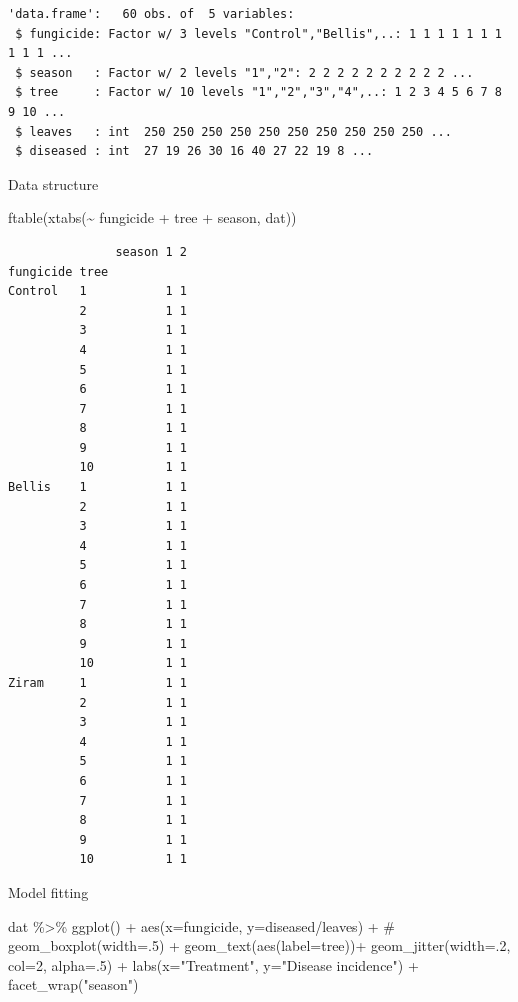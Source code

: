 \documentclass[
  letterpaper,
  DIV=11,
  numbers=noendperiod]{scrreport}
\newenvironment{Shaded}{\begin{snugshade}}{\end{snugshade}}
\newcommand{\AttributeTok}[1]{\textcolor[rgb]{0.40,0.45,0.13}{#1}}
\newcommand{\CommentTok}[1]{\textcolor[rgb]{0.37,0.37,0.37}{#1}}
\newcommand{\DecValTok}[1]{\textcolor[rgb]{0.68,0.00,0.00}{#1}}
\newcommand{\FunctionTok}[1]{\textcolor[rgb]{0.28,0.35,0.67}{#1}}
\newcommand{\NormalTok}[1]{\textcolor[rgb]{0.00,0.23,0.31}{#1}}
\newcommand{\SpecialCharTok}[1]{\textcolor[rgb]{0.37,0.37,0.37}{#1}}
\newcommand{\StringTok}[1]{\textcolor[rgb]{0.13,0.47,0.30}{#1}}
\begin{document}
\begin{verbatim}
'data.frame':   60 obs. of  5 variables:
 $ fungicide: Factor w/ 3 levels "Control","Bellis",..: 1 1 1 1 1 1 1 1 1 1 ...
 $ season   : Factor w/ 2 levels "1","2": 2 2 2 2 2 2 2 2 2 2 ...
 $ tree     : Factor w/ 10 levels "1","2","3","4",..: 1 2 3 4 5 6 7 8 9 10 ...
 $ leaves   : int  250 250 250 250 250 250 250 250 250 250 ...
 $ diseased : int  27 19 26 30 16 40 27 22 19 8 ...
\end{verbatim}

Data structure

\begin{Shaded}
\begin{Highlighting}[]
\FunctionTok{ftable}\NormalTok{(}\FunctionTok{xtabs}\NormalTok{(}\SpecialCharTok{\textasciitilde{}}\NormalTok{ fungicide }\SpecialCharTok{+}\NormalTok{ tree }\SpecialCharTok{+}\NormalTok{ season, dat))}
\end{Highlighting}
\end{Shaded}

\begin{verbatim}
               season 1 2
fungicide tree           
Control   1           1 1
          2           1 1
          3           1 1
          4           1 1
          5           1 1
          6           1 1
          7           1 1
          8           1 1
          9           1 1
          10          1 1
Bellis    1           1 1
          2           1 1
          3           1 1
          4           1 1
          5           1 1
          6           1 1
          7           1 1
          8           1 1
          9           1 1
          10          1 1
Ziram     1           1 1
          2           1 1
          3           1 1
          4           1 1
          5           1 1
          6           1 1
          7           1 1
          8           1 1
          9           1 1
          10          1 1
\end{verbatim}

Model fitting

\begin{Shaded}
\begin{Highlighting}[]
\NormalTok{dat }\SpecialCharTok{\%\textgreater{}\%} 
  \FunctionTok{ggplot}\NormalTok{() }\SpecialCharTok{+} 
  \FunctionTok{aes}\NormalTok{(}\AttributeTok{x=}\NormalTok{fungicide, }\AttributeTok{y=}\NormalTok{diseased}\SpecialCharTok{/}\NormalTok{leaves) }\SpecialCharTok{+} 
  \CommentTok{\# geom\_boxplot(width=.5) + }
  \FunctionTok{geom\_text}\NormalTok{(}\FunctionTok{aes}\NormalTok{(}\AttributeTok{label=}\NormalTok{tree))}\SpecialCharTok{+}
  \FunctionTok{geom\_jitter}\NormalTok{(}\AttributeTok{width=}\NormalTok{.}\DecValTok{2}\NormalTok{, }\AttributeTok{col=}\DecValTok{2}\NormalTok{, }\AttributeTok{alpha=}\NormalTok{.}\DecValTok{5}\NormalTok{) }\SpecialCharTok{+} 
  \FunctionTok{labs}\NormalTok{(}\AttributeTok{x=}\StringTok{"Treatment"}\NormalTok{, }\AttributeTok{y=}\StringTok{"Disease incidence"}\NormalTok{) }\SpecialCharTok{+} 
  \FunctionTok{facet\_wrap}\NormalTok{(}\StringTok{"season"}\NormalTok{)}
\end{Highlighting}
\end{Shaded}
\end{document}
